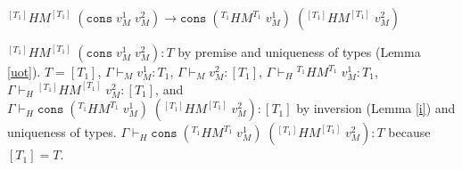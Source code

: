 \begin{case}
$^{[T_{1}]}HM^{[T_{1}]}\;(\mathtt{cons}\;v_{M}^{1}\;v_{M}^{2})\rightarrow\mathtt{cons}\;(^{T_{1}}HM^{T_{1}}\;v_{M}^{1})\;(^{[T_{1}]}HM^{[T_{1}]}\;v_{M}^{2})$

$^{[T_{1}]}HM^{[T_{1}]}\;(\mathtt{cons}\;v_{M}^{1}\;v_{M}^{2}):T$ by premise and uniqueness of types (Lemma \ref{uot}).  $T=[T_{1}]$, $\Gamma\vdash_{M}v_{M}^{1}:T_{1}$, $\Gamma\vdash_{M}v_{M}^{2}:[T_{1}]$, $\Gamma\vdash_{H}{^{T_{1}}H}M^{T_{1}}\;v_{M}^{1}:T_{1}$, $\Gamma\vdash_{H}{^{[T_{1}]}H}M^{[T_{1}]}\;v_{M}^{2}:[T_{1}]$, and $\Gamma\vdash_{H}\mathtt{cons}\;(^{T_{1}}HM^{T_{1}}\;v_{M}^{1})\;(^{[T_{1}]}HM^{[T_{1}]}\;v_{M}^{2}):[T_{1}]$ by inversion (Lemma \ref{i}) and uniqueness of types.  $\Gamma\vdash_{H}\mathtt{cons}\;(^{T_{1}}HM^{T_{1}}\;v_{M}^{1})\;(^{[T_{1}]}HM^{[T_{1}]}\;v_{M}^{2}):T$ because $[T_{1}]=T$.
\end{case}